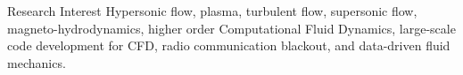 \begin{rubric}{Research Interest}
\entry*[ ]%
 Hypersonic flow, plasma, turbulent flow, supersonic flow, magneto-hydrodynamics, higher order Computational Fluid Dynamics, large-scale code development for CFD, radio communication blackout, and data-driven fluid mechanics. %
\end{rubric}